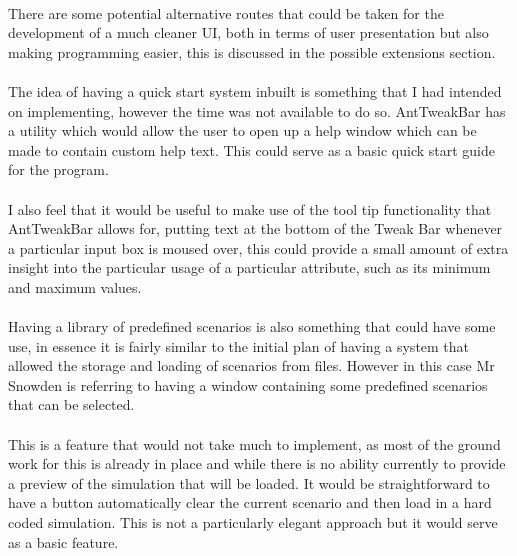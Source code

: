 \paragraph{}
There are some potential alternative routes that could be taken for the development of a much cleaner UI, both in terms of user presentation but also making programming easier, this is discussed in the possible extensions section.

\paragraph{}
The idea of having a quick start system inbuilt is something that I had intended on implementing, however the time was not available to do so. AntTweakBar has a utility which would allow the user to open up a help window which can be made to contain custom help text. This could serve as a basic quick start guide for the program.

\paragraph{}
I also feel that it would be useful to make use of the tool tip functionality that AntTweakBar allows for, putting text at the bottom of the Tweak Bar whenever a particular input box is moused over, this could provide a small amount of extra insight into the particular usage of a particular attribute, such as its minimum and maximum values.

\paragraph{}
Having a library of predefined scenarios is also something that could have some use, in essence it is fairly similar to the initial plan of having a system that allowed the storage and loading of scenarios from files. However in this case Mr Snowden is referring to having a window containing some predefined scenarios that can be selected.

\paragraph{}
This is a feature that would not take much to implement, as most of the ground work for this is already in place and while there is no ability currently to provide a preview of the simulation that will be loaded. It would be straightforward to have a button automatically clear the current scenario and then load in a hard coded simulation. This is not a particularly elegant approach but it would serve as a basic feature.

